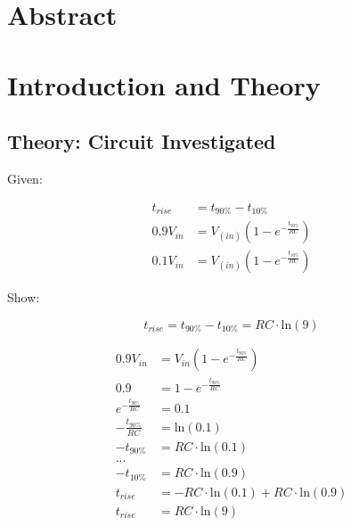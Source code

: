 \documentclass[EEEE]{KGCOEReport}
\begin{document}
\maketitle

\section*{Abstract}


\section{Introduction and Theory}


\subsection{Theory: Circuit Investigated}

Given:

\begin{align*}
	t_{rise}   & = t_{90\%} - t_{10\%}                                  \\
	0.9 V_{in} & = V_(in) \left( 1 - e ^ {-\frac{t_{90\%}}{RC}} \right) \\
	0.1 V_{in} & = V_(in) \left( 1 - e ^ {-\frac{t_{10\%}}{RC}} \right)
\end{align*}

Show:

\begin{equation}
	t_{rise} = t_{90\%} - t_{10\%} = RC \cdot \mathrm{ln}\left(9\right)
\end{equation}

\begin{align*}
	0.9 V_{in}                 & = V_{in} \left( 1 - e ^ {-\frac{t_{90\%}}{RC}} \right)                          \\
	0.9                        & = 1 - e ^ {-\frac{t_{90\%}}{RC}}                                                \\
	e ^ {-\frac{t_{90\%}}{RC}} & = 0.1                                                                           \\
	- \frac{t_{90\%}}{RC}      & = \mathrm{ln}\left(0.1\right)                                                   \\
	-t_{90\%}                  & = RC \cdot \mathrm{ln}\left(0.1\right)                                          \\
	...                                                                                                          \\
	-t_{10\%}                  & = RC \cdot \mathrm{ln}\left(0.9\right)                                          \\
	t_{rise}                   & = - RC \cdot \mathrm{ln}\left(0.1\right) + RC \cdot \mathrm{ln}\left(0.9\right) \\
	t_{rise}                   & = RC \cdot \mathrm{ln}\left(9\right)
\end{align*}
\end{document}
